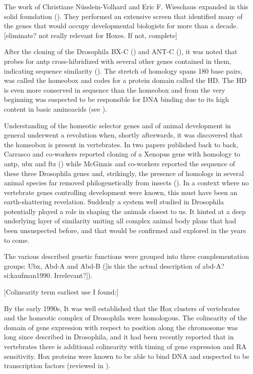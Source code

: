 The work of Christiane Nüsslein-Volhard and Eric F. Wieschaus expanded in this solid foundation (\cite{Nuesslein-Volhard1980}). They performed an extensive screen that identified many of the genes that would occupy developmental biologists for more than a decade. [eliminate? not really relevant for Hoxes. If not, complete]

After the cloning of the Drosophila \ac{BX-C} (\cite{Bender1983}) and \ac{ANT-C} (\cite{Garber1983,Scott1983}), it was noted that probes for \ac{antp} cross-hibridized with several other genes contained in them, indicating sequence similarity (\cite{McGinnis1984}).  The stretch of homology spans 180 base pairs, was called the homeobox and codes for a protein domain called the \ac{HD}. The \ac{HD} is even more conserved in sequence than the homeobox and from the very beginning was suspected to be responsible for DNA binding due to its high content in basic aminoacids (see \cite{Gehring1985}).

Understanding of the homeotic selector genes and of animal development in general underwent a revolution when, shortly afterwards, it was discovered that the homeobox is present in vertebrates. In two papers published back to back, Carrasco and co-workers reported cloning of a Xenopus gene with homology to \ac{antp}, \ac{ubx} and \ac{ftz} (\cite{Carrasco1984}) while McGinnis and co-workers reported the sequence of these three Drosophila genes and, strikingly, the presence of homologs in several animal species far removed philogenetically from insects (\cite{McGinnis1984b}). In a context where no vertebrate genes controlling development were known, this must have been an earth-shattering revelation. Suddenly a system well studied in Drosophila potentially played a role in shaping the animals closest to us. It hinted at a deep underlying layer of similarity uniting all complex animal body plans that had been unsuspected before, and that would be confirmed and explored in the years to come.

The various described genetic functions were grouped into three complementation groups: Ubx, Abd-A and Abd-B (\cite{Sanchez-Herrero1985}[is this the actual description of abd-A?si:kaufman1990. Irrelevant?]).

[Colinearity term earliest use I found:\cite{Lewis1985}]

By the early 1990s, It was well established that the Hox clusters of vertebrates and the homeotic complex of Drosophila were homologous. The colinearity of the domain of gene expression with respect to position along the chromosome was long since described in  Drosophila, and it had been recently reported that in vertebrates there is additional colinearity with timing of gene expression and RA sensitivity. Hox proteins were known to be able to bind DNA and suspected to be transcription factors (reviewed in \cite{Levine1988, McGinnis1992}). 


